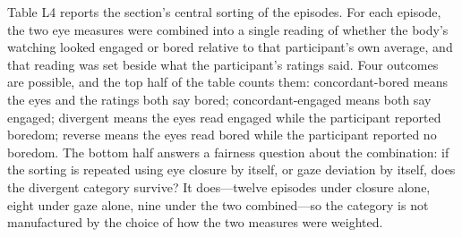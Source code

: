 % 

Table L4 reports the section's central sorting of the episodes. For each episode, the two eye
measures were combined into a single reading of whether the body's watching looked engaged or
bored relative to that participant's own average, and that reading was set beside what the
participant's ratings said. Four outcomes are possible, and the top half of the table counts
them: concordant-bored means the eyes and the ratings both say bored; concordant-engaged
means both say engaged; divergent means the eyes read engaged while the participant reported
boredom; reverse means the eyes read bored while the participant reported no boredom. The
bottom half answers a fairness question about the combination: if the sorting is repeated
using eye closure by itself, or gaze deviation by itself, does the divergent category
survive? It does---twelve episodes under closure alone, eight under gaze alone, nine under
the two combined---so the category is not manufactured by the choice of how the two measures
were weighted.

% 

%

